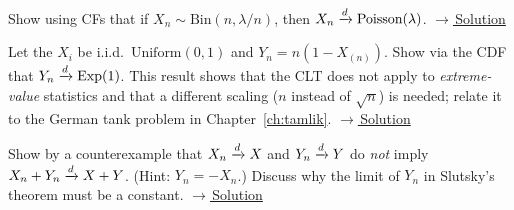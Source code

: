 \documentclass[main.tex]{subfiles}
\begin{document}
\begin{exercise}\label{exr:06-2}
Show using CFs that if $X_n\sim\text{Bin}(n,\lambda/n)$, then $X_n\xrightarrow{d}\text{Poisson}(\lambda)$.
\hfill\hyperref[coz:06-2]{\footnotesize$\rightarrow$\,Solution}
\end{exercise}

\begin{exercise}\label{exr:06-3}
Let the $X_i$ be i.i.d.\ $\text{Uniform}(0,1)$ and $Y_n=n(1-X_{(n)})$. Show via the CDF that $Y_n\xrightarrow{d}\text{Exp}(1)$. This result shows that the CLT does not apply to \emph{extreme-value} statistics and that a different scaling ($n$ instead of $\sqrt n$) is needed; relate it to the German tank problem in Chapter~\ref{ch:tamlik}.
\hfill\hyperref[coz:06-3]{\footnotesize$\rightarrow$\,Solution}
\end{exercise}

\begin{exercise}\label{exr:06-4}
Show by a counterexample that $X_n\xrightarrow{d} X$ and $Y_n\xrightarrow{d} Y$ do \emph{not} imply $X_n+Y_n\xrightarrow{d} X+Y$. (Hint: $Y_n=-X_n$.) Discuss why the limit of $Y_n$ in Slutsky's theorem must be a constant.
\hfill\hyperref[coz:06-4]{\footnotesize$\rightarrow$\,Solution}
\end{exercise}

\end{document}
